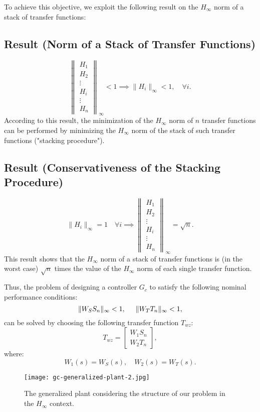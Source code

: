 To achieve this objective, we exploit the following result on the $H_\infty$ norm of a stack of transfer functions:

\subsection{Result (Norm of a Stack of Transfer Functions)}
\[
\left\|
\begin{array}{c}
H_1 \\
H_2 \\
\vdots \\
H_i \\
\vdots \\
H_n
\end{array}
\right\|_\infty
< 1
\implies
\|H_i\|_\infty < 1, \quad \forall i.
\]
According to this result, the minimization of the $H_\infty$ norm of $n$ transfer functions can be performed by minimizing the $H_\infty$ norm of the stack of such transfer functions ("stacking procedure").

\subsection{Result (Conservativeness of the Stacking Procedure)}
\[
\|H_i\|_\infty = 1 \quad \forall i \implies 
\left\|
\begin{array}{c}
H_1 \\
H_2 \\
\vdots \\
H_i \\
\vdots \\
H_n
\end{array}
\right\|_\infty
= \sqrt{n}.
\]
This result shows that the $H_\infty$ norm of a stack of transfer functions is (in the worst case) $\sqrt{n}$ times the value of the $H_\infty$ norm of each single transfer function.

Thus, the problem of designing a controller $G_c$ to satisfy the following nominal performance conditions:
\[
\|W_SS_n\|_\infty < 1, \hspace{0.5cm} \|W_TT_n\|_\infty < 1,
\]
can be solved by choosing the following transfer function $T_{wz}$:
\[
T_{wz} =
\begin{bmatrix}
W_1S_n \\
W_2T_n
\end{bmatrix},
\]
where:
\[
W_1(s) = W_S(s), \quad W_2(s) = W_T(s).
\]

\begin{figure}[H]
    \centering
    \texttt{[image: gc-generalized-plant-2.jpg]}
    \caption{The generalized plant considering the structure of our problem in the $H_\infty$ context.}
\end{figure}

